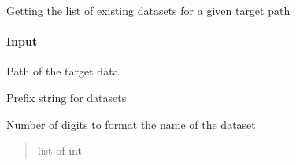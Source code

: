 \documentclass[letterpaper,10pt,english]{sphinxmanual}
\begin{document}
\begin{fulllineitems}
\label{\detokenize{api/pymusepipe:pymusepipe.util_pipe.get_list_datasets}}
\pysigstartsignatures
{}
\pysigstopsignatures
\sphinxAtStartPar
Getting the list of existing datasets for a given target path


\paragraph{Input}
\label{\detokenize{api/pymusepipe:id166}}\begin{description}
\sphinxAtStartPar
Path of the target data

\sphinxAtStartPar
Prefix string for datasets

\sphinxAtStartPar
Number of digits to format the name of the dataset

\end{description}
\begin{quote}\begin{description}
\sphinxAtStartPar
{}

\sphinxAtStartPar
list of int

\end{description}\end{quote}

\end{fulllineitems}

\end{document}
